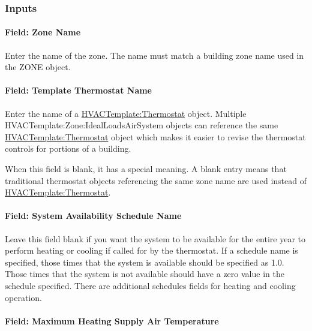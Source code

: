 \subsubsection{Inputs}\label{inputs-1-022}

\paragraph{Field: Zone Name}\label{field-zone-name-006}

Enter the name of the zone. The name must match a building zone name used in the ZONE object.

\paragraph{Field: Template Thermostat Name}\label{field-template-thermostat-name}

Enter the name of a \hyperref[hvactemplatethermostat]{HVACTemplate:Thermostat} object. Multiple HVACTemplate:Zone:IdealLoadsAirSystem objects can reference the same \hyperref[hvactemplatethermostat]{HVACTemplate:Thermostat} object which makes it easier to revise the thermostat controls for portions of a building.

When this field is blank, it has a special meaning. A blank entry means that traditional thermostat objects referencing the same zone name are used instead of \hyperref[hvactemplatethermostat]{HVACTemplate:Thermostat}.

\paragraph{Field: System Availability Schedule Name}\label{field-system-availability-schedule-name}

Leave this field blank if you want the system to be available for the entire year to perform heating or cooling if called for by the thermostat. If a schedule name is specified, those times that the system is available should be specified as 1.0. Those times that the system is not available should have a zero value in the schedule specified. There are additional schedules fields for heating and cooling operation.

\paragraph{Field: Maximum Heating Supply Air Temperature}\label{field-maximum-heating-supply-air-temperature}

